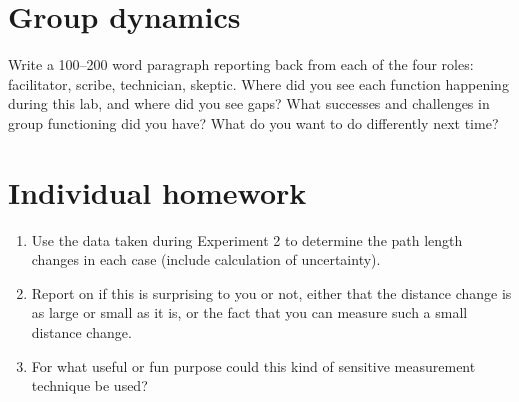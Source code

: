 \section{Group dynamics}

\begin{steps}
	\item Write a 100--200 word paragraph reporting back from each of the four roles: facilitator, scribe, technician, skeptic. Where did you see each function happening during this lab, and where did you see gaps? What successes and challenges in group functioning did you have? What do you want to do differently next time?
\end{steps}

\section{Individual homework}

\begin{enumerate}
	\item Use the data taken during Experiment 2 to determine the path length changes in each case (include calculation of uncertainty).
	
	\item Report on if this is surprising to you or not, either that the distance change is as large or small as it is, or the fact that you can measure such a small distance change.
	
	\item For what useful or fun purpose could this kind of sensitive measurement technique be used?
\end{enumerate}
